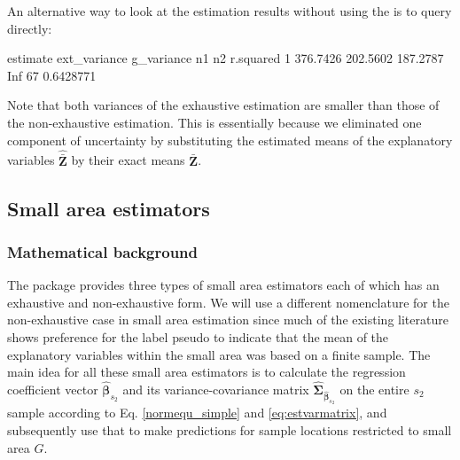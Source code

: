 An alternative way to look at the estimation results without using the  is to query  directly:
\begin{small}
\begin{Schunk}
\begin{Soutput}
  estimate ext_variance g_variance  n1 n2 r.squared
1 376.7426     202.5602   187.2787 Inf 67 0.6428771
\end{Soutput}
\end{Schunk}
\end{small}
Note that both variances of the exhaustive estimation are smaller than those of the non-exhaustive estimation. This is essentially because we eliminated one component of uncertainty by substituting the estimated means of the explanatory variables $$ by their exact means $\bar{}$.



\subsection{Small area estimators}
\label{sec:twophase_sae}

\subsubsection{Mathematical background}

The  package provides three types of small area estimators each of which has an exhaustive and non-exhaustive form. We will use a different nomenclature for the non-exhaustive case in small area estimation since much of the existing literature shows preference for the label pseudo to indicate that the mean of the explanatory variables within the small area was based on a finite sample. The main idea for all these small area estimators is to calculate the regression coefficient vector $\hat{\pmb{\beta}}_{s_2}$ and its variance-covariance matrix $\hat{\pmb{\Sigma}}_{\hat{\pmb{\beta}}_{s_2}}$ on the entire $s_2$ sample according to Eq. \ref{normequ_simple} and \ref{eq:estvarmatrix}, and subsequently use that to make predictions for sample locations restricted to small area $G$.\par

